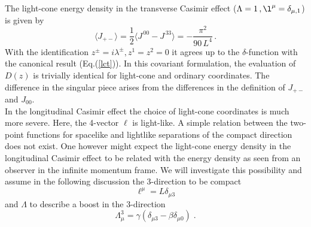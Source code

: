\documentclass[a4paper,twocolumn,eqsecnum,aps]{revtex4}
\begin{document}
The light-cone energy density in the transverse Casimir effect ($\Lambda =1\, , \l^{\mu}= \delta_{\mu,1}$)  is given by 
\begin{equation}
  \label{lced}
  \langle J_{+ - }\rangle = \frac{1}{2}\langle J^{\,00} - J^{\,33} \rangle = - \frac{\pi ^{2}}{90 \, L^{4}} \, .
\end{equation}
 With the identification
 $z^{\pm}=i\lambda^{\pm}, z^1=z^2=0$ it agrees   up to the $\delta$-function with the 
canonical result (Eq.(\ref{lct})). 
In this covariant formulation,  the evaluation of $D(z)$ is trivially identical for light-cone and ordinary 
coordinates. The difference in the singular piece arises from the differences in the definition 
of $J_{+-} $ and $J_{00}$.  \\
In the longitudinal Casimir effect the choice of light-cone coordinates is much more severe. Here, the 4-vector $\ell$ is light-like. A simple relation between the  two-point functions  for  spacelike and lightlike separations of the compact direction does not exist. 
One however might expect  
the  light-cone energy density in the longitudinal Casimir effect  to be related 
with  the energy density as seen from an observer in the infinite momentum frame. We will investigate this possibility and assume in the following discussion  the 3-direction  to be compact
$$\ell ^{\mu} = L\delta_{\mu 3}$$ 
and  $\Lambda$ to describe a boost in the 3-direction 
\begin{equation}
  \label{boo}
\Lambda^{3}_{\mu} = \gamma (\delta_{\mu 3}-\beta \delta_{\mu 0})\;.  
\end{equation}
 
\end{document}

